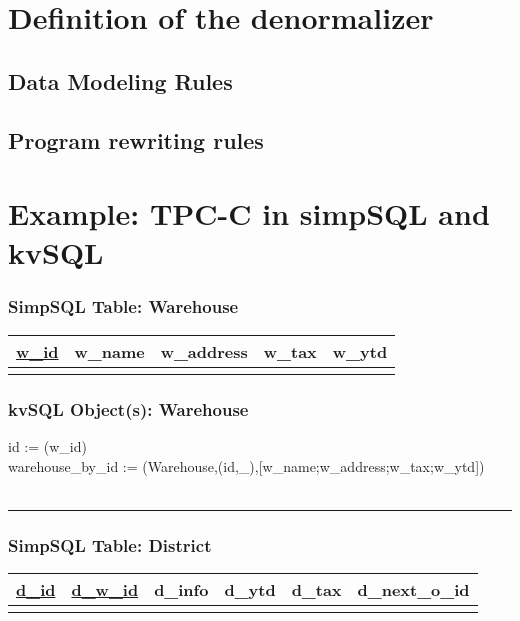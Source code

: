 \documentclass[12pt,letter]{article}
\begin{document}
\section{Definition of the denormalizer}
\subsection{Data Modeling Rules}

\subsection{Program rewriting rules}




\newpage
\section{Example: TPC-C in simpSQL and kvSQL}

\subsubsection*{SimpSQL Table: Warehouse}  
\begin{tabular}{ |c|c|c|c|c| }
 \hline
 \underline{w\_id} & w\_name & w\_address & w\_tax & w\_ytd \\
 \hline
 &   &   & & \\
 \hline
\end{tabular}

\subsubsection*{kvSQL Object(s): Warehouse}  
id := (w\_id) \\
warehouse\_by\_id :=
(Warehouse,(id,\_),[w\_name;w\_address;w\_tax;w\_ytd]) 
\\ \\
\hrule

\subsubsection*{SimpSQL Table: District}  
\begin{tabular}{ |c|c|c|c|c|c| }
 \hline
 \underline{d\_id} & \underline{d\_w\_id} & d\_info & d\_ytd & d\_tax & d\_next\_o\_id\\
 \hline
 &   &   & & &\\
 \hline
\end{tabular}
\end{document}
